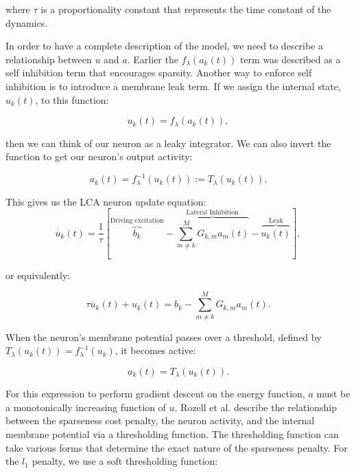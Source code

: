 \noindent where $\tau$ is a proportionality constant that represents the time constant of the dynamics.

In order to have a complete description of the model, we need to describe a relationship between $u$ and $a$. Earlier the $f_{\lambda}(a_{k}(t))$ term was described as a self inhibition term that encourages sparsity. Another way to enforce self inhibition is to introduce a membrane leak term. If we assign the internal state, $u_{k}(t)$, to this function:

\begin{equation}\label{eq:ch2_u_func_a}
    u_k(t) = f_{\lambda}(a_{k}(t)),
\end{equation}

\noindent then we can think of our neuron as a leaky integrator. We can also invert the function to get our neuron's output activity:

\begin{displaymath}\label{eq:ch2_a_fu_thresh}
    a_{k}(t) = f_{\lambda}^{-1}(u_{k}(t)) := T_{\lambda}(u_{k}(t)).
\end{displaymath}

This gives us the LCA neuron update equation:
\begin{equation}\label{eq:ch2_u_dot_full}
    \dot{u_{k}}(t) = \frac{1}{\tau} \left[\overbrace{b_{k}}^\text{Driving excitation} - \overbrace{\sum_{m \neq k}^{M}G_{k,m}a_{m}(t)}^\text{Lateral Inhibition} - \overbrace{u_{k}(t)}^\text{Leak} \right],
\end{equation}

\noindent or equivalently:

\begin{displaymath}
    \tau \dot{u_{k}}(t) + u_{k}(t) =  b_{k} - \sum_{m \neq k}^{M}G_{k,m}a_{m}(t).
\end{displaymath}

When the neuron's membrane potential passes over a threshold, defined by $T_{\lambda}(u_{k}(t)) = f_{\lambda}^{-1}(u_{k})$, it becomes active:

\begin{equation}\label{eq:ch2_a_thresh}
  a_{k}(t) = T_{\lambda}(u_{k}(t)).
\end{equation}

For this expression to perform gradient descent on the energy function, $a$ must be a monotonically increasing function of $u$. Rozell et al. \citeyearpar{rozell2008sparse} describe the relationship between the sparseness cost penalty, the neuron activity, and the internal membrane potential via a thresholding function. The thresholding function can take various forms that determine the exact nature of the sparseness penalty. For the $l_{1}$ penalty, we use a soft thresholding function:

